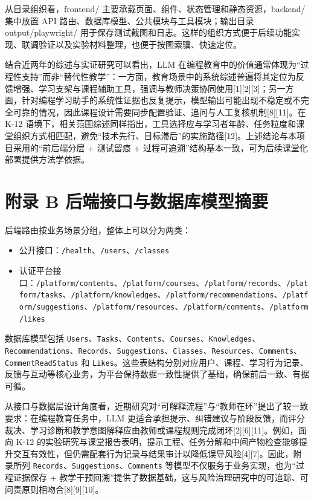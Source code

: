 从目录组织看，frontend/ 主要承载页面、组件、状态管理和静态资源，backend/ 集中放置 API 路由、数据库模型、公共模块与工具模块；输出目录 output/playwright/ 用于保存测试截图和日志。这样的组织方式便于后续功能实现、联调验证以及实验材料整理，也便于按图索骥、快速定位。

结合近两年的综述与实证研究可以看出，LLM 在编程教育中的价值通常体现为“过程性支持”而非“替代性教学”：一方面，教育场景中的系统综述普遍将其定位为反馈增强、学习支架与课程辅助工具，强调与教师决策协同使用{[}1{]}{[}2{]}{[}3{]}；另一方面，针对编程学习助手的系统性证据也反复提示，模型输出可能出现不稳定或不完全可靠的情况，因此课程设计需要同步配置验证、追问与人工复核机制{[}8{]}{[}11{]}。在 K-12 语境下，相关范围综述同样指出，工具选择应与学习者年龄、任务粒度和课堂组织方式相匹配，避免“技术先行、目标滞后”的实施路径{[}12{]}。上述结论与本项目采用的“前后端分层 + 测试留痕 + 过程可追溯”结构基本一致，可为后续课堂化部署提供方法学依据。

\section{附录 B 后端接口与数据库模型摘要}\label{ux9644ux5f55-b-ux540eux7aefux63a5ux53e3ux4e0eux6570ux636eux5e93ux6a21ux578bux6458ux8981}

后端路由按业务场景分组，整体上可以分为两类：

\begin{itemize}
  \item 公开接口：\texttt{/health}、\texttt{/users}、\texttt{/classes}
  \item 认证平台接口：\texttt{/platform/contents}、\texttt{/platform/courses}、\texttt{/platform/records}、\texttt{/platform/tasks}、\texttt{/platform/knowledges}、\texttt{/platform/recommendations}、\texttt{/platform/suggestions}、\texttt{/platform/resources}、\texttt{/platform/comments}、\texttt{/platform/likes}
\end{itemize}

数据库模型包括 \texttt{Users}、\texttt{Tasks}、\texttt{Contents}、\texttt{Courses}、\texttt{Knowledges}、\texttt{Recommendations}、\texttt{Records}、\texttt{Suggestions}、\texttt{Classes}、\texttt{Resources}、\texttt{Comments}、\texttt{CommentReadStatus} 和 \texttt{Likes}。这些表结构分别对应用户、课程、学习行为记录、反馈与互动等核心业务，为平台保持数据一致性提供了基础，确保前后一致、有据可循。

从接口与数据层设计角度看，近期研究对“可解释流程”与“教师在环”提出了较一致要求：在编程教育任务中，LLM 更适合承担提示、纠错建议与阶段反馈，而评分裁决、学习诊断和教学意图解释应由教师或课程规则完成闭环{[}2{]}{[}6{]}{[}11{]}。例如，面向 K-12 的实验研究与课堂报告表明，提示工程、任务分解和中间产物检查能够提升交互有效性，但仍需配套行为记录与结果审计以降低误导风险{[}4{]}{[}7{]}。因此，附录所列 \texttt{Records}、\texttt{Suggestions}、\texttt{Comments} 等模型不仅服务于业务实现，也为“过程证据保存 + 教学干预回溯”提供了数据基础，这与风险治理研究中的可追踪、可问责原则相吻合{[}8{]}{[}9{]}{[}10{]}。

